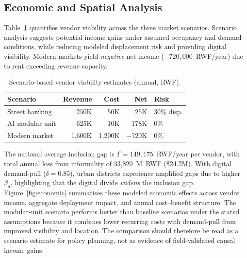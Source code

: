 \documentclass{article}
\begin{document}
\subsection{Economic and Spatial Analysis}

Table~\ref{tab:viability} quantifies vendor viability across the three market scenarios.
Scenario analysis suggests potential income gains under assumed occupancy and demand conditions, while reducing modeled displacement risk and providing digital visibility.
Modern markets yield \emph{negative} net income ($-720{,}000$~RWF/year) due to rent exceeding revenue capacity.

\begin{table}[t]
    \centering
    \caption{Scenario-based vendor viability estimates (annual, RWF).}
    \label{tab:viability}
    \begin{tabular}{@{}lrrrl@{}}
        \toprule
        Scenario & Revenue & Cost & Net & Risk \\
        \midrule
        Street hawking & 250K & 50K & 25K & 30\% disp. \\
        AI modular unit & 625K & 10K & 178K & 0\% \\
        Modern market & 1,600K & 1,200K & $-$720K & 0\% \\
        \bottomrule
    \end{tabular}
\end{table}

\begin{table}[t]
    \centering
    \caption{Income sensitivity to assumed foot-traffic multiplier.}
    \label{tab:sensitivity}
\end{table}

The national average inclusion gap is $\Gamma = 149{,}175$~RWF/year per vendor, with total annual loss from informality of 33,820~M~RWF (\$24.2M).
With digital demand-pull ($\delta = 0.85$), urban districts experience amplified gaps due to higher $\beta_d$, highlighting that the digital divide \emph{widens} the inclusion gap.
Figure~\ref{fig:economic} summarises these modeled economic effects across vendor income, aggregate deployment impact, and annual cost--benefit structure.
The modular-unit scenario performs better than baseline scenarios under the stated assumptions because it combines lower recurring costs with demand-pull from improved visibility and location.
The comparison should therefore be read as a scenario estimate for policy planning, not as evidence of field-validated causal income gains.
\end{document}

